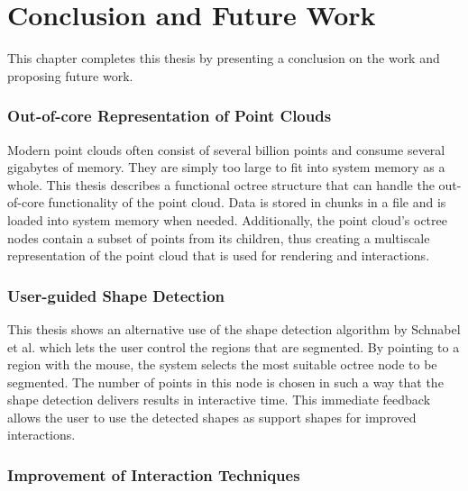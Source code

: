 \chapter{Conclusion and Future Work}
\label{chap:conclusion}


This chapter completes this thesis by presenting a conclusion on the work and proposing future work.

\subsection*{Out-of-core Representation of Point Clouds}

Modern point clouds often consist of several billion points and consume several gigabytes of memory. They are simply too large to fit into system memory as a whole. This thesis describes a functional octree structure that can handle the out-of-core functionality of the point cloud. Data is stored in chunks in a file and is loaded into system memory when needed. Additionally, the point cloud's octree nodes contain a subset of points from its children, thus creating a multiscale representation of the point cloud that is used for rendering and interactions. 


\subsection*{User-guided Shape Detection}

This thesis shows an alternative use of the shape detection algorithm by Schnabel et al. \cite{schnabel-2007-efficient} which lets the user control the regions that are segmented. By pointing to a region with the mouse, the system selects the most suitable octree node to be segmented. The number of points in this node is chosen in such a way that the shape detection delivers results in interactive time. This immediate feedback allows the user to use the detected shapes as support shapes for improved interactions. 


\subsection*{Improvement of Interaction Techniques}

